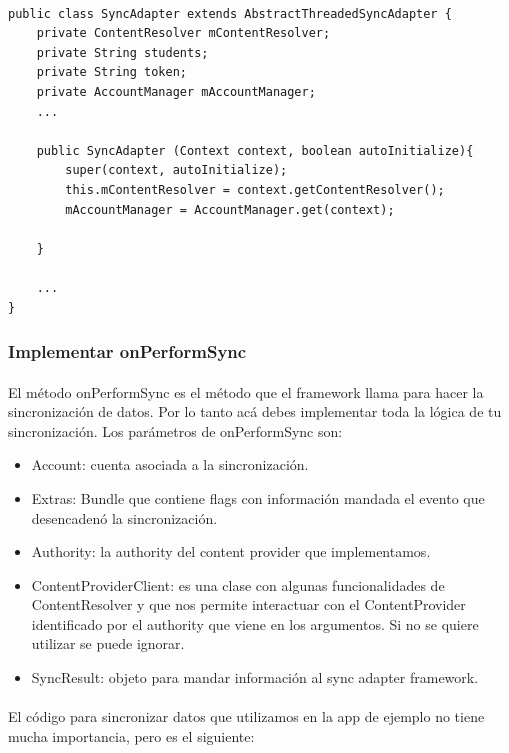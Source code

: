 \documentclass[10pt]{extarticle}
\begin{document}
\begin{lstlisting}

public class SyncAdapter extends AbstractThreadedSyncAdapter {
    private ContentResolver mContentResolver;
    private String students;
    private String token;
    private AccountManager mAccountManager;
	...

    public SyncAdapter (Context context, boolean autoInitialize){
        super(context, autoInitialize);
        this.mContentResolver = context.getContentResolver();
        mAccountManager = AccountManager.get(context);

    }
	
	...
}
\end{lstlisting}

\subsubsection{Implementar onPerformSync}

\paragraph{}
El método onPerformSync es el método que el framework llama para hacer la sincronización de datos. Por lo tanto acá debes implementar toda la lógica de tu sincronización. Los parámetros de onPerformSync son:

\begin{itemize}
	\item Account: cuenta asociada a la sincronización.
	\item Extras: Bundle que contiene flags con información mandada el evento que desencadenó la sincronización.
	\item Authority: la authority del content provider que implementamos.
	\item ContentProviderClient: es una clase con algunas funcionalidades de ContentResolver y que nos permite interactuar con el ContentProvider identificado por el authority que viene en los argumentos. Si no se quiere utilizar se puede ignorar.
	\item SyncResult: objeto para mandar información al sync adapter framework.
\end{itemize}

\paragraph{}
El código para sincronizar datos que utilizamos en la app de ejemplo no tiene mucha importancia, pero es el siguiente:
\end{document}
